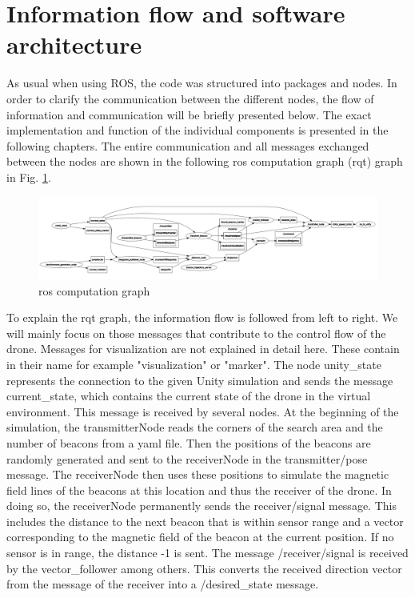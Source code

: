 \documentclass[conference]{IEEEtran}
\begin{document}
\section{Information flow and software architecture}
As usual when using ROS, the code was structured into packages and nodes. In order to clarify the communication between the different nodes, the flow of information and communication will be briefly presented below. The exact implementation and function of the individual components is presented in the following chapters.
The entire communication and all messages exchanged between the nodes are shown in the following ros computation graph (rqt) graph in Fig. \ref{fig:rqt}.
\begin{figure}[htbp]
\centerline{\includegraphics[width=1\columnwidth]{final_rqt_graph.png}}
\caption{ros computation graph}
\label{fig:rqt}
\end{figure}
To explain the rqt graph, the information flow is followed from left to right. We will mainly focus on those messages that contribute to the control flow of the drone. Messages for visualization are not explained in detail here. These contain in their name for example "visualization" or "marker".
The node unity\_state represents the connection to the given Unity simulation and sends the message current\_state, which contains the current state of the drone in the virtual environment. This message is received by several nodes.
At the beginning of the simulation, the transmitterNode reads the corners of the search area and the number of beacons from a yaml file. Then the positions of the beacons are randomly generated and sent to the receiverNode in the transmitter/pose message.
The receiverNode then uses these positions to simulate the magnetic field lines of the beacons at this location and thus the receiver of the drone. In doing so, the receiverNode permanently sends the receiver/signal message. This includes the distance to the next beacon that is within sensor range and a vector corresponding to the magnetic field of the beacon at the current position. If no sensor is in range, the distance -1 is sent.
The message /receiver/signal is received by the vector\_follower among others. This converts the received direction vector from the message of the receiver into a /desired\_state message.
\end{document}
